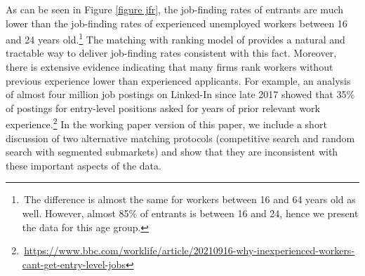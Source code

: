 \documentclass[12pt]{article} %
\theoremstyle{definition}
\begin{document}
As can be seen in Figure \ref{figure jfr}, the job-finding rates of entrants are much lower than the job-finding rates of experienced unemployed workers between 16 and 24 years old.\footnote{\,The difference is almost the same for workers between 16 and 64 years old as well. However, almost 85\% of entrants is between 16 and 24, hence we present the data for this age group.} The matching with ranking model of  %
\cite{petrongolo2001looking} provides a natural and tractable way to deliver job-finding rates consistent with this fact. 
Moreover, there is extensive evidence indicating that many firms rank workers without previous experience lower than experienced applicants.
For example, an analysis of almost four million job postings on Linked-In since late 2017 showed that 35\% of postings for entry-level positions asked for years of prior relevant work experience.\footnote{\,\scriptsize{\url{https://www.bbc.com/worklife/article/20210916-why-inexperienced-workers-cant-get-entry-level-jobs}}}
In the working paper version of this paper, we include a short discussion of two alternative matching protocols (competitive search and random search with segmented submarkets) and show that they are inconsistent with these important aspects of the data. 
\end{document}
